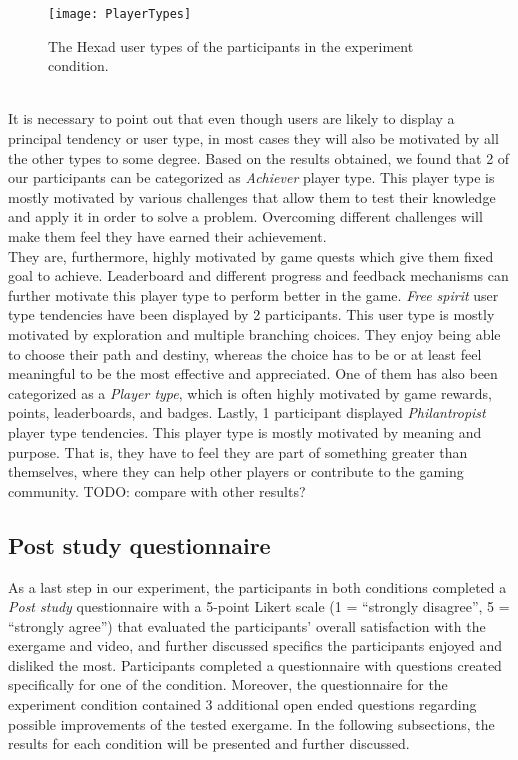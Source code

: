 \begin{figure}[h]
    \centering
    \texttt{[image: PlayerTypes]}
    \caption{The Hexad user types of the participants in the experiment condition.}
    \label{fig:playerTypes}
\end{figure}\\ It is necessary to point out that even though users are likely to display a principal tendency or user type, in most cases they will also be motivated by all the other types to some degree. Based on the results obtained, we found that 2  of our participants can be categorized as \textit{Achiever} player type. This player type is mostly motivated by various challenges that allow them to test their knowledge and apply it in order to solve a problem. Overcoming different challenges will make them feel they have earned their achievement. \\They are, furthermore, highly motivated by game quests which give them fixed goal to achieve. Leaderboard and different progress and feedback mechanisms can further motivate this player type to perform better in the game. \textit{Free spirit} user type tendencies have been displayed by 2 participants. This user type is mostly motivated by exploration and multiple branching choices. They enjoy being able to choose their path and destiny, whereas the choice has to be or at least feel meaningful to be the most effective and appreciated. One of them has also been categorized as a \textit{Player type}, which is often highly motivated by game rewards, points, leaderboards, and badges. Lastly, 1 participant displayed \textit{Philantropist} player type tendencies. This player type is mostly motivated by meaning and purpose. That is, they have to feel they are part of something greater than themselves, where they can help other players or contribute to the gaming community. TODO: compare with other results? \\ 
\subsection{Post study questionnaire}
As a last step in our experiment, the participants in both conditions completed  a \textit{Post study} questionnaire with a 5-point Likert scale (1 = ``strongly disagree'', 5 = ``strongly agree'') that evaluated the participants' overall satisfaction with the exergame and video, and further discussed specifics the participants enjoyed and disliked the most. Participants completed a questionnaire with questions created specifically for one of the condition. Moreover, the questionnaire for the experiment condition contained 3 additional open ended questions regarding possible improvements of the tested exergame. In the following subsections, the results for each condition will be presented and further discussed.
